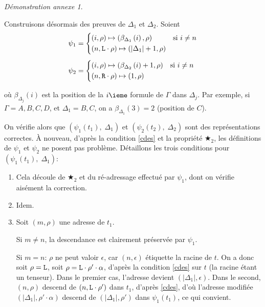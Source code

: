 \documentclass[11pt,a4paper]{article}
\theoremstyle{plain}
\theoremstyle{definition}
\theoremstyle{remark}
\newtheorem{demonstrationappendix}{Démonstration annexe}
\newcommand*{\someadd}{\rho}
\newcommand*{\sequent}{\Gamma}
\newcommand*{\sequentbis}{\Delta}
\newcommand*{\Left}{\textnormal{\texttt{L}}}
\newcommand*{\Right}{\textnormal{\texttt{R}}}
\begin{document}
\begin{demonstrationappendix}
\begin{description}
        Construisons désormais des preuves de $\sequentbis_1$ et $\sequentbis_2$. Soient
        \begin{align*}
            \psi_1 &=
            \begin{cases*}
                (i, \someadd) \mapsto (\beta_{\sequentbis_1} \left( i \right), \someadd) & si $i \neq n$\\
                (n, \Left \cdot \someadd) \mapsto (| \sequentbis_1 | + 1, \someadd)
            \end{cases*} \\[1ex]
            \psi_2 &=
            \begin{cases*}
                (i, \someadd) \mapsto (\beta_{\sequentbis_2} \left( i \right) + 1, \someadd) & si $i \neq n$\\
                (n, \Right \cdot \someadd) \mapsto (1, \someadd)
            \end{cases*} 
        \end{align*}
    
        où $\beta_{\sequentbis_j} \left( i \right)$ est la position de la $i\ieme$ formule de $\sequent$ dans $\sequentbis_j$. Par exemple, si $\sequent = A, B, C, D$, et $\sequentbis_1 = B, C$, on a $\beta_{\sequentbis_1} \left( 3 \right) = 2$ (position de $C$).
    
        On vérifie alors que $\left( \psi_1 \left( t_1 \right), \; \sequentbis_1 \right)$ et $\left( \psi_2 \left( t_2 \right), \; \sequentbis_2 \right)$ sont des représentations correctes. À nouveau, d'après la condition \ref{cdes} et la propriété $\bigstar_2$, les définitions de $\psi_1$ et $\psi_2$ ne posent pas problème. Détaillons les trois conditions pour $\left( \psi_1 \left( t_1 \right), \; \sequentbis_1 \right)$:
    
        \begin{enumerate}
            \item Cela découle de $\bigstar_2$ et du ré-adressage effectué par $\psi_1$, dont on vérifie aisément la correction.
            
            \item Idem.
    
            \item Soit $(m, \someadd)$ une adresse de $t_1$.
            
            Si $m \neq n$, la descendance est clairement préservée par $\psi_1$.
            
            Si $m = n$: $\someadd$ ne peut valoir $\epsilon$, car $(n, \epsilon)$ étiquette la racine de $t$. On a donc soit $\someadd = \Left$, soit $\someadd = \Left \cdot \someadd' \cdot \alpha$, d'après la condition \ref{cdes} sur $t$ (la racine étant un tenseur). Dans le premier cas, l'adresse devient $(| \sequentbis_1 |, \epsilon)$. Dans le second, $(n, \someadd)$ descend de $(n, \Left \cdot \someadd' )$ dans $t_1$, d'après \ref{cdes}, d'où l'adresse modifiée $(| \sequentbis_1 |, \someadd' \cdot \alpha)$ descend de $(| \sequentbis_1 |, \someadd')$ dans $\psi_1 \left( t_1 \right)$, ce qui convient.
        \end{enumerate}
    

\end{description}
\end{demonstrationappendix}
\end{document}
